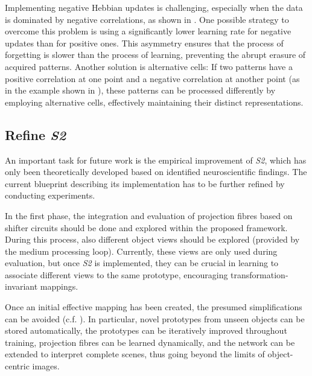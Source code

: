 Implementing negative Hebbian updates is challenging, especially when the data is dominated by negative correlations, as shown in .
One possible strategy to overcome this problem is using a significantly lower learning rate for negative updates than for positive ones.
This asymmetry ensures that the process of forgetting is slower than the process of learning, preventing the abrupt erasure of acquired patterns.
Another solution is alternative cells: If two patterns have a positive correlation at one point and a negative correlation at another point (as in the example shown in ), these patterns can be processed differently by employing alternative cells, effectively maintaining their distinct representations.


\subsection{Refine \emph{S2}}
An important task for future work is the empirical improvement of \emph{S2}, which has only been theoretically developed based on identified neuroscientific findings. The current blueprint describing its implementation has to be further refined by conducting experiments.

In the first phase, the integration and evaluation of projection fibres based on shifter circuits  should be done and explored within the proposed framework.
During this process, also different object views should be explored (provided by the medium processing loop). Currently, these views are only used during evaluation, but once \emph{S2} is implemented, they can be crucial in learning to associate different views to the same prototype, encouraging transformation-invariant mappings.

Once an initial effective mapping has been created, the presumed simplifications can be avoided (c.f. ). In particular, novel prototypes from unseen objects can be stored automatically, the prototypes can be iteratively improved throughout training, projection fibres can be learned dynamically, and the network can be extended to interpret complete scenes, thus going beyond the limits of object-centric images.






